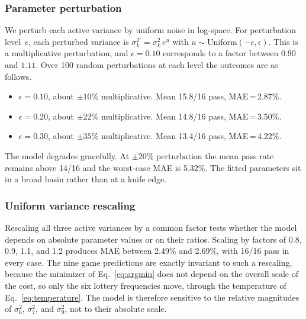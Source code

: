 \documentclass[journal]{IEEEtran}
\begin{document}
\subsubsection{Parameter perturbation}
We perturb each active variance by uniform noise in log-space.
For perturbation level~$\epsilon$, each perturbed variance is $\sigma_k^{2\prime} = \sigma_k^2 \, e^{u}$ with $u \sim \mathrm{Uniform}(-\epsilon, \epsilon)$.
This is a multiplicative perturbation, and $\epsilon = 0.10$ corresponds to a factor between $0.90$ and $1.11$.
Over 100 random perturbations at each level the outcomes are as follows.
\begin{itemize}
    \item $\epsilon = 0.10$, about $\pm10\%$ multiplicative. Mean 15.8/16 pass, MAE\,=\,2.87\%.
    \item $\epsilon = 0.20$, about $\pm22\%$ multiplicative. Mean 14.8/16 pass, MAE\,=\,3.50\%.
    \item $\epsilon = 0.30$, about $\pm35\%$ multiplicative. Mean 13.4/16 pass, MAE\,=\,4.22\%.
\end{itemize}
The model degrades gracefully.
At $\pm20\%$ perturbation the mean pass rate remains above 14/16 and the worst-case MAE is 5.32\%.
The fitted parameters sit in a broad basin rather than at a knife edge.

\subsubsection{Uniform variance rescaling}
Rescaling all three active variances by a common factor tests whether the model depends on absolute parameter values or on their ratios.
Scaling by factors of 0.8, 0.9, 1.1, and 1.2 produces MAE between 2.49\% and 2.69\%, with 16/16 pass in every case.
The nine game predictions are exactly invariant to such a rescaling, because the minimizer of Eq.~\eqref{eq:argmin} does not depend on the overall scale of the cost, so only the six lottery frequencies move, through the temperature of Eq.~\eqref{eq:temperature}.
The model is therefore sensitive to the relative magnitudes of $\sigma_6^2$, $\sigma_7^2$, and $\sigma_9^2$, not to their absolute scale.
\end{document}
